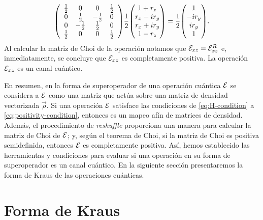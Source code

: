 \begin{align}
\mqty(
\begin{array}{cccc}
\frac{1}{2} & 0 & 0 & \frac{1}{2} \\
0 & \frac{1}{2} & -\frac{1}{2} & 0 \\
0 & -\frac{1}{2} & \frac{1}{2} & 0 \\
\frac{1}{2} & 0 & 0 & \frac{1}{2} \\
\end{array}
)
\frac{1}{2}
\mqty(
1+r_z\\r_x-ir_y\\r_x+ir_y\\1-r_z
)
=
\frac{1}{2}
\mqty(
1\\-ir_y\\ir_y\\1
).
\label{eq:QC-ex2-SR}
\end{align}
Al calcular la matriz de Choi de la operación notamos 
que $\mathcal{E}_{xz}=\mathcal{E}_{xz}^R$ e, inmediatamente, se concluye
que $\mathcal{E}_{xz}$ es completamente positiva. La operación $\mathcal{E}_{xz}$
es un canal cuántico.

En resumen, en la forma de superoperador de una operación cuántica $\mathcal{E}$
se considera a $\mathcal{E}$ como una matriz que actúa sobre 
una matriz de densidad vectorizada $\vec{\rho}$. 
Si una operación $\mathcal{E}$ satisface las condiciones de
\eqref{eq:H-condition} a \eqref{eq:positivity-condition}, entonces
es un mapeo afín de matrices de densidad.
Además, el procedimiento de \textit{reshuffle} 
proporciona una manera para calcular la matriz de Choi de
 $\mathcal{E}$; y, según el teorema de Choi, si 
la matriz de Choi es positiva semidefinida, entonces $\mathcal{E}$ es 
completamente positiva. 
Así, hemos establecido las herramientas y condiciones para evaluar 
si una operación en su forma de superoperador es un canal cuántico.
En la siguiente sección presentaremos la forma de Kraus de las operaciones
cuánticas.

\section{Forma de Kraus}
 

